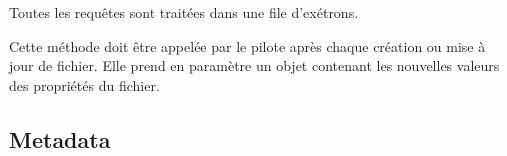 \documentclass[letterpaper,10pt,english]{sphinxmanual}
\begin{document}
\begin{fulllineitems}
\begin{fulllineitems}
\begin{itemize}
\begin{fulllineitems}
Toutes les requêtes sont traitées dans une file d'exétrons.

\end{fulllineitems}


\end{itemize}

\end{fulllineitems}


\begin{fulllineitems}
\label{drivers:onitu.api.Plug.update_file}
Cette méthode doit être appelée par le pilote après chaque création ou mise à jour de fichier. Elle prend en paramètre un objet {\hyperref[drivers:onitu.api.metadata.Metadata]{}} contenant les nouvelles valeurs des propriétés du fichier.

\end{fulllineitems}


\end{fulllineitems}



\subsection{Metadata}
\label{drivers:metadata}
\end{document}
